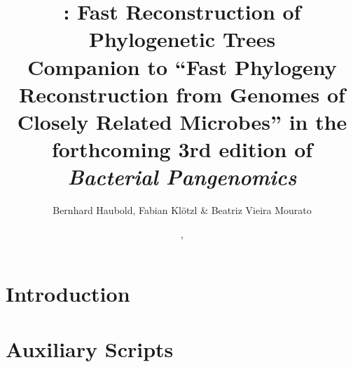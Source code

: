 \documentclass[a4paper]{report}
\begin{document}
\pagestyle{noweb}

\title{: Fast Reconstruction of Phylogenetic Trees\\\small
Companion to ``Fast Phylogeny Reconstruction from Genomes of Closely
Related Microbes'' in the forthcoming 3rd edition of \emph{Bacterial Pangenomics}}
\author{Bernhard Haubold, Fabian Klötzl \& Beatriz Vieira Mourato}
\date{\!\!, }
\maketitle
\tableofcontents
\chapter{Introduction}

\chapter{Auxiliary Scripts}\label{ch:sim}



\end{document}
